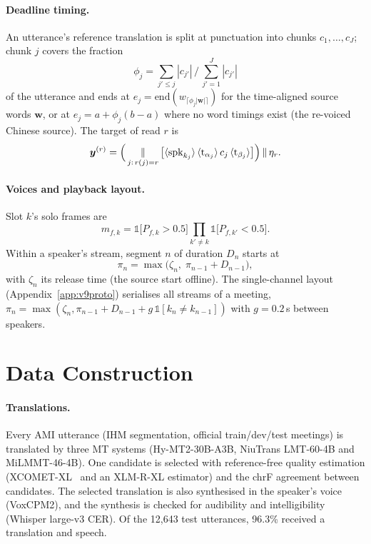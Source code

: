 \paragraph{Deadline timing.} An utterance's reference translation is split at punctuation into chunks $c_1,\dots,c_J$;
chunk $j$ covers the fraction
\begin{equation}
\phi_j=\textstyle\sum_{j'\le j}|c_{j'}|\,/\,\sum_{j'=1}^{J}|c_{j'}|
\label{eq:frac}
\end{equation}
of the utterance and ends at $e_j=\mathrm{end}(w_{\lceil\phi_j|\bm{w}|\rceil})$ for the time-aligned source words
$\bm{w}$, or at $e_j=a+\phi_j(b-a)$ where no word timings exist (the re-voiced Chinese source). The target of read $r$ is
\begin{equation}
\bm{y}^{(r)}=\Big(\mathop{\Vert}_{j:\,r(j)=r}\big[\langle\mathrm{spk}_{k_j}\rangle\,\langle\mathrm{t}_{\alpha_j}\rangle\,c_j\,\langle\mathrm{t}_{\beta_j}\rangle\big]\Big)\,\Vert\,\eta_r .
\label{eq:readtarget}
\end{equation}

\paragraph{Voices and playback layout.} Slot $k$'s solo frames are
\begin{equation}
m_{f,k}=\mathds{1}\big[P_{f,k}>0.5\big]\prod_{k'\neq k}\mathds{1}\big[P_{f,k'}<0.5\big].
\label{eq:alone}
\end{equation}
Within a speaker's stream, segment $n$ of duration $D_n$ starts at
\begin{equation}
\pi_n=\max\big(\zeta_n,\;\pi_{n-1}+D_{n-1}\big),
\label{eq:layout}
\end{equation}
with $\zeta_n$ its release time (the source start offline). The single-channel layout (Appendix~\ref{app:v9proto})
serialises all streams of a meeting, $\pi_n=\max(\zeta_n,\pi_{n-1}+D_{n-1}+g\,\mathds{1}[k_n\neq k_{n-1}])$ with
$g=0.2$\,s between speakers.

\section{Data Construction}
\label{app:data}



\paragraph{Translations.} Every AMI utterance (IHM segmentation, official train/dev/test meetings) is translated by
three MT systems (Hy-MT2-30B-A3B, NiuTrans LMT-60-4B and MiLMMT-46-4B). One candidate is selected with reference-free
quality estimation (XCOMET-XL~\citep{guerreiro2024xcomet} and an XLM-R-XL estimator) and the chrF agreement between candidates. The selected
translation is also synthesised in the speaker's voice (VoxCPM2), and the synthesis is checked for audibility and
intelligibility (Whisper large-v3 CER). Of the 12{,}643 test utterances, 96.3\% received a translation and speech.

